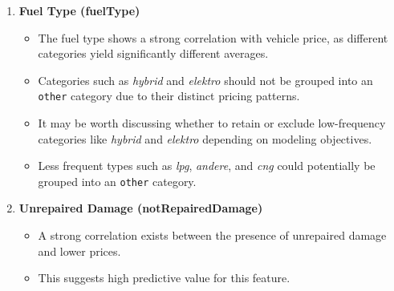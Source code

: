 \documentclass[conference]{IEEEtran}
\begin{document}
\begin{enumerate}
    \item \textbf{Fuel Type (fuelType)}
    \begin{itemize}
        \item The fuel type shows a strong correlation with vehicle price, as
                different categories yield significantly different averages.
        \item Categories such as \textit{hybrid} and \textit{elektro} should
                not be grouped into an \texttt{other} category due to their
                distinct pricing patterns.
        \item It may be worth discussing whether to retain or exclude
                low-frequency categories like \textit{hybrid} and
                \textit{elektro} depending on modeling objectives.
        \item Less frequent types such as \textit{lpg}, \textit{andere}, and
                \textit{cng} could potentially be grouped into an
                \texttt{other} category.
    \end{itemize}

    \item \textbf{Unrepaired Damage (notRepairedDamage)}
    \begin{itemize}
        \item A strong correlation exists between the presence of unrepaired
                damage and lower prices.
        \item This suggests high predictive value for this feature.
    \end{itemize}
\end{enumerate}
\end{document}
